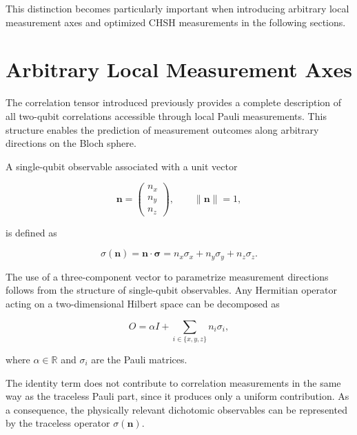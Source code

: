 This distinction becomes particularly important when introducing arbitrary local measurement axes and optimized CHSH measurements in the following sections.


\section{Arbitrary Local Measurement Axes}

The correlation tensor introduced previously provides a complete description of all two-qubit correlations accessible through local Pauli measurements. This structure enables the prediction of measurement outcomes along arbitrary directions on the Bloch sphere.

\medskip

A single-qubit observable associated with a unit vector

\[
\mathbf{n}
=
\begin{pmatrix}
n_x\\
n_y\\
n_z
\end{pmatrix},
\qquad
\|\mathbf{n}\| = 1,
\]

is defined as

\begin{equation}
\sigma(\mathbf{n})
=
\mathbf{n} \cdot \boldsymbol{\sigma}
=
n_x \sigma_x + n_y \sigma_y + n_z \sigma_z.
\label{eq:measurement_operator_axis}
\end{equation}

\medskip

The use of a three-component vector to parametrize measurement directions follows from the structure of single-qubit observables. Any Hermitian operator acting on a two-dimensional Hilbert space can be decomposed as

\begin{equation}
O
=
\alpha I
+
\sum_{i \in \{x,y,z\}}
n_i \sigma_i,
\label{eq:single_qubit_observable_decomposition}
\end{equation}

where \( \alpha \in \mathbb{R} \) and \( \sigma_i \) are the Pauli matrices.

\medskip

The identity term does not contribute to correlation measurements in the same way as the traceless Pauli part, since it produces only a uniform contribution. As a consequence, the physically relevant dichotomic observables can be represented by the traceless operator \( \sigma(\mathbf{n}) \).


